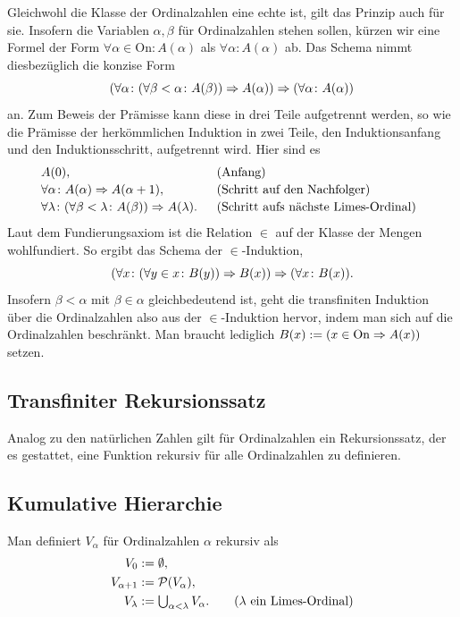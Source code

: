 \noindent
Gleichwohl die Klasse der Ordinalzahlen eine echte ist, gilt das Prinzip
auch für sie. Insofern die Variablen $\alpha,\beta$ für Ordinalzahlen stehen
sollen, kürzen wir eine Formel der Form $\forall\alpha\in\mathrm{On}\colon A(\alpha)$
als $\forall\alpha\colon A(\alpha)$ ab. Das Schema nimmt diesbezüglich
die konzise Form%
\[(\forall\alpha\colon (\forall\beta < \alpha\colon A(\beta))
\Rightarrow A(\alpha))\Rightarrow (\forall\alpha\colon A(\alpha))\]
an. Zum Beweis der Prämisse kann diese in drei Teile aufgetrennt
werden, so wie die Prämisse der herkömmlichen Induktion in zwei
Teile, den Induktionsanfang und den Induktionsschritt, aufgetrennt wird.
Hier sind es
\[\begin{array}{@{}l@{\quad\;\;}l}
A(0), & \text{(Anfang)}\\[2pt]
\forall\alpha\colon A(\alpha)\cond A(\alpha+1), & \text{(Schritt auf den Nachfolger)}\\[2pt]
\forall\lambda\colon (\forall\beta<\lambda\colon A(\beta))\cond A(\lambda). & \text{(Schritt
aufs nächste Limes-Ordinal)}
\end{array}\]
Laut dem Fundierungsaxiom ist die Relation $\in$ auf der Klasse der
Mengen wohlfundiert. So ergibt das Schema der $\in$-Induktion,%
%
\[(\forall x\colon (\forall y\in x\colon B(y))
\Rightarrow B(x))\Rightarrow (\forall x\colon B(x)).\]
Insofern $\beta<\alpha$ mit $\beta\in\alpha$ gleichbedeutend ist,
geht die transfiniten Induktion über die Ordinalzahlen also
aus der $\in$-Induktion hervor, indem man sich auf die Ordinalzahlen
beschränkt. Man braucht lediglich $B(x):=(x\in\mathrm{On}\Rightarrow A(x))$
setzen.

\subsection{Transfiniter Rekursionssatz}

Analog zu den natürlichen Zahlen gilt für Ordinalzahlen ein
Rekursionssatz, der es gestattet,
eine Funktion rekursiv für alle Ordinalzahlen zu definieren.

\subsection{Kumulative Hierarchie}

\begin{Definition}%
\newlinefirst
Man definiert $V_\alpha$ für Ordinalzahlen $\alpha$ rekursiv als
\begin{align*}
V_0 &:= \emptyset,\\
V_{\alpha+1} &:= \mathcal P(V_\alpha),\\
V_\lambda &:= {\textstyle\bigcup_{\alpha<\lambda} V_\alpha}.\qquad\text{($\lambda$ ein Limes-Ordinal)}
\end{align*}
\end{Definition}

